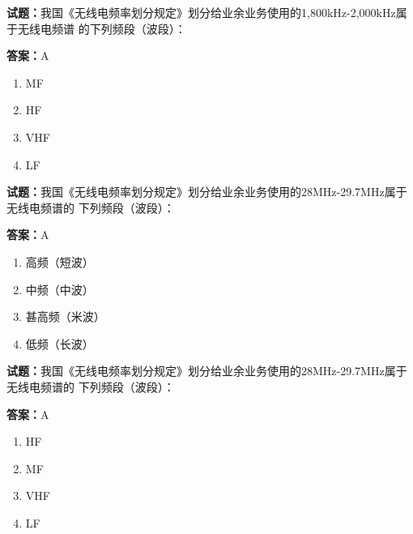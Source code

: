 \documentclass{ctexbook}
\begin{document}




\vspace{1em}

\textbf{试题：}我国《无线电频率划分规定》划分给业余业务使用的1,800kHz-2,000kHz属于无线电频谱
的下列频段（波段）： 

\textbf{答案：}A 

\begin{enumerate}[leftmargin=3em]
  \item MF 

  \item HF 

  \item VHF 

  \item LF 

\end{enumerate}





\vspace{1em}

\textbf{试题：}我国《无线电频率划分规定》划分给业余业务使用的28MHz-29.7MHz属于无线电频谱的
下列频段（波段）： 

\textbf{答案：}A 

\begin{enumerate}[leftmargin=3em]
  \item 高频（短波） 

  \item 中频（中波） 

  \item 甚高频（米波） 

  \item 低频（长波） 

\end{enumerate}





\vspace{1em}

\textbf{试题：}我国《无线电频率划分规定》划分给业余业务使用的28MHz-29.7MHz属于无线电频谱的
下列频段（波段）： 


\textbf{答案：}A 

\begin{enumerate}[leftmargin=3em]
  \item HF 

  \item MF 

  \item VHF 

  \item LF 

\end{enumerate}
\end{document}
